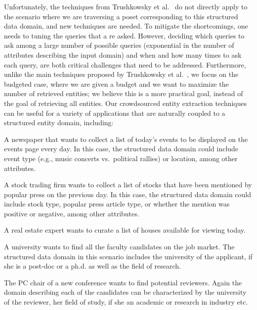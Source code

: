 Unfortunately, the techniques from Trushkowsky et al.~\cite{trushkowsky:2013} do not directly apply to the scenario where we are traversing a poset corresponding to this structured data domain, and new techniques are needed. To mitigate the shortcomings, one needs to tuning the queries that a re asked. However, deciding which queries to ask among a large number of possible queries (exponential in the number of attributes describing the input domain) and when and how many times to ask each query, are both critical challenges that need to be addressed. Furthermore, unlike the main techniques proposed by Trushkowsky et al.~\cite{trushkowsky:2013}, we focus on the budgeted case, where we are given a budget and we want to maximize the number of retrieved entities; we believe this is a more practical goal, instead of the goal of retrieving all entities.  
Our crowdsourced entity extraction techniques can be useful for a variety of applications that are naturally coupled to a structured entity domain, including:
\squishlist
\item A newspaper that wants to collect a list of today's events to be displayed on the events page every day. 
In this case, the structured data domain could include event type (e.g., music concerts vs.~political rallies) or location, among other attributes.
\item A stock trading firm wants to collect a list of stocks that have been mentioned by popular press on the previous day. In this case, the structured data domain could include stock type, popular press article type, or whether the mention was positive or negative, among other attributes. 
\item A real estate expert wants to curate a list of houses available for viewing today. 
\item A university wants to find all the faculty candidates on the job market. The structured data domain in this scenario includes the university of the applicant, if she is a post-doc or a ph.d. as well as the field of research.
\item The PC chair of a new conference wants to find potential reviewers. Again the domain describing each of the candidates can be characterized by the university of the reviewer, her field of study, if she an academic or research in industry etc. 
\squishend


